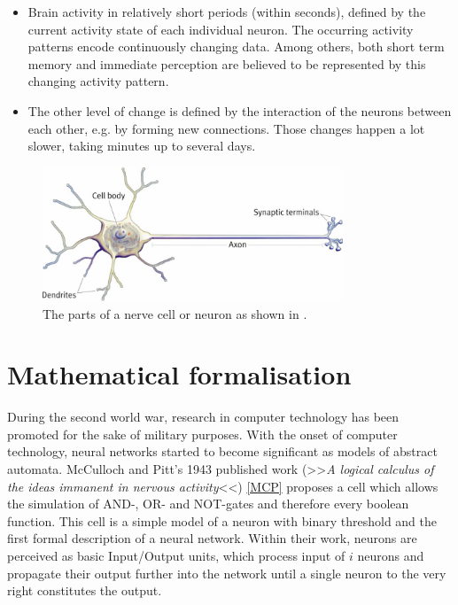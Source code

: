 \documentclass[10pt,a4paper,DIV=11]{scrreprt}
\begin{document}
\begin{itemize}
    \item Brain activity in relatively short periods (within seconds), defined by the current activity state of each individual neuron. 
    The occurring activity patterns encode continuously changing data. Among others, both short term memory and immediate perception are believed to be 
represented by this changing activity pattern.
    \item The other level of change is defined by the interaction of the neurons between each other, e.g. by forming new connections. 
    Those changes happen a lot slower, taking minutes up to several days.\cite{NEUINF} 
\end{itemize}

\begin{center}
\begin{figure}[H]

\includegraphics[width=0.8\textwidth,scale=1]{files/neuron.jpg}  
\caption{The parts of a nerve cell or neuron as shown in \cite{NEU}.}
\label{fig:neuron}
\end{figure}
\end{center}


\section{Mathematical formalisation}\label{sec:mcpitts}
During the second world war, research in computer technology has been promoted for the sake of military purposes. With the onset of computer 
technology, neural networks started to become significant as models of abstract automata. McCulloch and Pitt's 1943 published work 
(>>\textit{A logical calculus of the ideas immanent in nervous activity}<<) \ref{MCP} proposes a cell which allows the simulation of AND-, OR- and 
NOT-gates and therefore every boolean function. This cell is a simple model of a neuron with binary threshold and the first formal description of a 
neural network. Within their work, neurons are perceived as basic Input/Output units, which process input of $i$ neurons and propagate their 
output further into the network until a single neuron to the very right constitutes the output.\\
\end{document}
